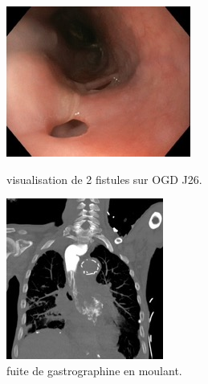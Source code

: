 \documentclass[./tfe]{subfiles}
\begin{document}
\begin{figure}[!h]
    \centering
    \begin{minipage}[b]{.5\textwidth}
        \centering
        \includegraphics[width=.95\textwidth]{images/endoscopie.jpg}
        \caption{visualisation de 2 fistules sur OGD J26.}
        \label{fig:endoscopie}
    \end{minipage}%
%
    \begin{minipage}[b]{.5\textwidth}
        \centering
        \includegraphics[width=.95\textwidth]{images/ct_fuite_de_grastrographine.jpg}
        \caption{fuite de gastrographine en moulant.}
        \label{fig:fuite_grastrographine}
    \end{minipage}
\end{figure}
\end{document}
